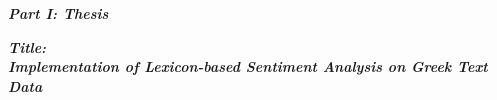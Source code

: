 
\begin{center}


\vspace*{\fill}

\textbf{\textit{\large Part I: Thesis}}

\hfill

\textbf{\textit{Title:}} \\
\textbf{\textit{\large Implementation of Lexicon-based Sentiment Analysis on Greek Text Data}}

\vspace*{\fill}

\end{center}
